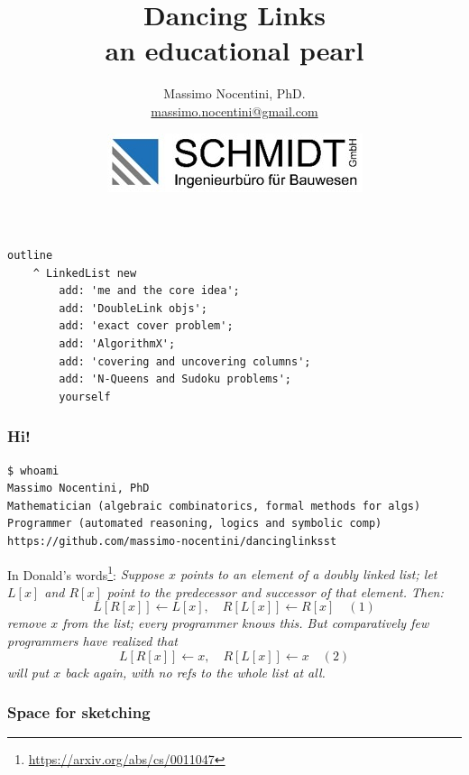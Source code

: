 \documentclass[10pt]{beamer}
\title{Dancing Links\\\small{an educational pearl}}
\author{Massimo Nocentini, PhD.\\\footnotesize{\url{massimo.nocentini@gmail.com}}}
\institute{ESUG2019 -- \today.}
\date{\vspace{0.5cm}\includegraphics{SchmidtLogo.jpg}}
\begin{document}
\frame{\titlepage}


\begin{frame}[fragile]
\frametitle{}
\begin{verbatim}
outline
    ^ LinkedList new
        add: 'me and the core idea';
        add: 'DoubleLink objs';
        add: 'exact cover problem';
        add: 'AlgorithmX';
        add: 'covering and uncovering columns';
        add: 'N-Queens and Sudoku problems';
        yourself
\end{verbatim}
\end{frame}

\begin{frame}[fragile]
\frametitle{Hi!}
\begin{Verbatim}[fontsize=\small]
$ whoami
Massimo Nocentini, PhD
Mathematician (algebraic combinatorics, formal methods for algs)
Programmer (automated reasoning, logics and symbolic comp)
https://github.com/massimo-nocentini/dancinglinksst
\end{Verbatim}
\vfill
In Donald's words\footnote{\url{https://arxiv.org/abs/cs/0011047}}:
\emph{
Suppose $x$ points to an element of a doubly linked list;
let $L[x]$ and $R[x]$ point to the predecessor and successor
of that element. Then:
\begin{displaymath}
  L[R[x]] \leftarrow L[x],\quad R[L[x]] \leftarrow R[x] \quad(1)
\end{displaymath}
remove $x$ from the list; every programmer knows this.
But comparatively few programmers have realized that
\begin{displaymath}
  L[R[x]] \leftarrow x,\quad R[L[x]] \leftarrow x \quad(2)
\end{displaymath}
will put $x$ back again, with no refs to the whole list at all.
}

\end{frame}

\begin{frame}[fragile]
\frametitle{Space for sketching}
\end{frame}
\end{document}
